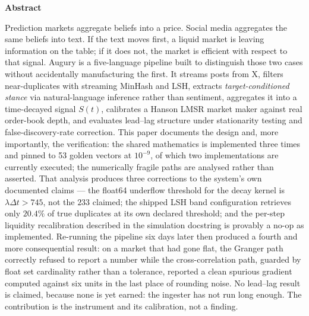 \documentclass[11pt]{article}
\begin{document}
\thispagestyle{empty}
\vspace*{1.5cm}
\begin{center}{\large\bfseries Abstract}\end{center}
\vspace{0.6em}
\begin{center}
\begin{minipage}{0.90\textwidth}
\noindent
Prediction markets aggregate beliefs into a price. Social media aggregates the
same beliefs into text. If the text moves first, a liquid market is leaving
information on the table; if it does not, the market is efficient with respect
to that signal. Augury is a five-language pipeline built to distinguish those
two cases without accidentally manufacturing the first. It streams posts from X,
filters near-duplicates with streaming MinHash and LSH, extracts
\emph{target-conditioned stance} via natural-language inference rather than
sentiment, aggregates it into a time-decayed signal $S(t)$, calibrates a
Hanson LMSR market maker against real order-book depth, and evaluates
lead--lag structure under stationarity testing and false-discovery-rate
correction. This paper documents the design and, more importantly, the
verification: the shared mathematics is implemented three times and pinned to 53
golden vectors at $10^{-9}$, of which two implementations are currently
executed; the numerically fragile paths are analysed rather than asserted. That
analysis produces three corrections to the system's own documented claims ---
the float64 underflow threshold for the decay kernel is $\lambda\Delta t > 745$,
not the $233$ claimed; the shipped LSH band configuration retrieves only
$20.4\%$ of true duplicates at its own declared threshold; and the per-step
liquidity recalibration described in the simulation docstring is provably a
no-op as implemented. Re-running the pipeline six days later then produced a
fourth and more consequential result: on a market that had gone flat, the
Granger path correctly refused to report a number while the cross-correlation
path, guarded by float set cardinality rather than a tolerance, reported a clean
spurious gradient computed against six units in the last place of rounding
noise. No lead--lag result is claimed, because none is yet earned: the ingester
has not run long enough. The contribution is the instrument and its calibration,
not a finding.
\end{minipage}
\end{center}
\clearpage
\end{document}
